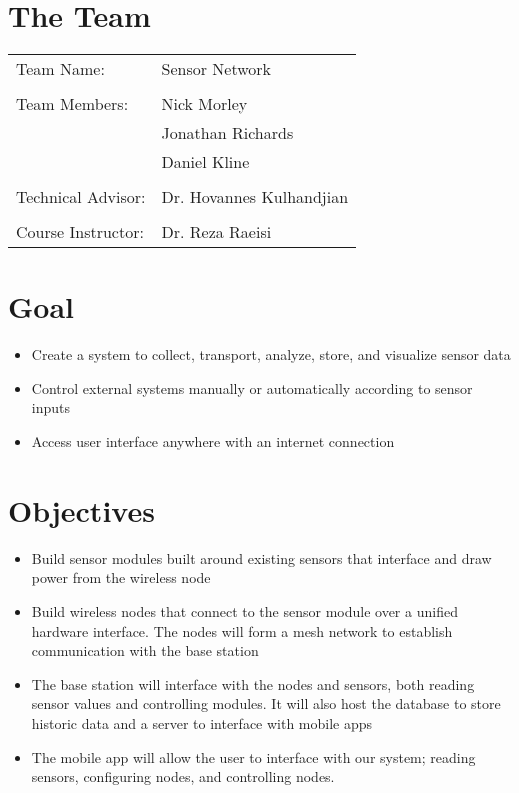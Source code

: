 


  	
	\section{The Team}
		\begin{tabular}{l l}
			Team Name:    & Sensor Network    \\
			\\
			Team Members: & Nick Morley       \\
			              & Jonathan Richards \\
			              & Daniel Kline\\
			              \\
			Technical Advisor: & Dr. Hovannes Kulhandjian\\
			\\
			Course Instructor: & Dr. Reza Raeisi\\
		\end{tabular}
		 
	\section{Goal}
		\begin{itemize}
			\item Create a system to collect, transport, analyze, store, and visualize sensor data
			\item Control external systems manually or automatically according to sensor inputs
			\item Access user interface anywhere with an internet connection
		\end{itemize}
		
	\section{Objectives}
		\begin{itemize}
			\item Build sensor modules built around existing sensors that interface and draw power from the wireless node
			\item Build wireless nodes that connect to the sensor module over a unified hardware interface. The nodes will form a mesh network to establish communication with the base station
			\item The base station will interface with the nodes and sensors, both reading sensor values and controlling modules. It will also host the database to store historic data and a server to interface with mobile apps
			\item The mobile app will allow the user to interface with our system; reading sensors, configuring nodes, and controlling nodes.
		\end{itemize}
	
